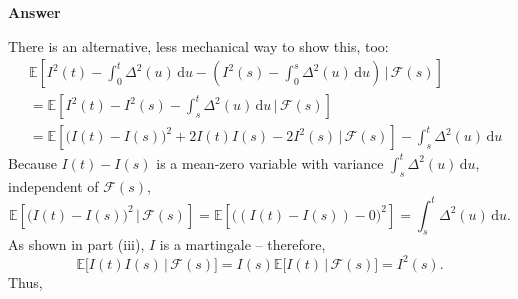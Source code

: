 \documentclass[11pt]{article}
\newcommand\E{\mathbb{E}}
\newcommand\cF{\mathcal{F}}
\newenvironment{hwanswer}
    {
        \vspace{2mm}
        {\bfseries Answer}
        \vspace{-\abovedisplayskip}
        \begin{center}
            \begin{tcolorbox}[
                width=0.95\textwidth,
                colback=white,
                colframe=white,
                opacityback=0,
                opacityframe=0,
                boxrule=0pt,
                frame hidden,
                breakable,
                before upper={\parindent15pt} %
            ]
            \lineskip=0pt %
    }
    {
        \end{tcolorbox}
        \end{center}
        \vspace{4mm}
    }
\begin{document}
\begin{hwanswer}
\begin{enumerate}[(i)]
            There is an alternative, less mechanical way to show this, too:
            \[
                \begin{aligned}
                    {}
                    &
                    \E\left[
                        I^2(t) - \int_{0}^{t} \Delta^2(u) \, \text{d} u
                        -
                        \left(
                            I^2(s) - \int_{0}^{s} \Delta^2(u) \, \text{d} u
                        \right)
                        \, \bigg| \,
                        \cF(s)
                    \right]
                    \\
                    &=
                    \E\left[
                        I^2(t) - I^2(s)
                        -
                        \int_{s}^{t} \Delta^2(u) \, \text{d} u
                        \, \bigg| \,
                        \cF(s)
                    \right]
                    \\
                    &=
                    \E\left[
                        \big( I(t) - I(s) \big)^2
                        +
                        2 I(t) I(s)
                        -
                        2 I^2(s)
                        \, | \,
                        \cF(s)
                    \right]
                    -
                    \int_{s}^{t} \Delta^2(u) \, \text{d} u
                \end{aligned}
            \]
            Because $I(t) - I(s)$ is a mean-zero variable with variance $\int_{s}^{t}
            \Delta^2(u) \, \text{d} u$, independent of $\cF(s)$,
            \[
                \E\left[
                    \big( I(t) - I(s) \big)^2
                    \, | \,
                    \cF(s)
                \right]
                =
                \E\left[
                    \big( (I(t) - I(s)) - 0 \big)^2
                \right]
                =
                \int_{s}^{t} \Delta^2(u) \, \text{d} u.
            \]
            As shown in part (iii), $I$ is a martingale -- therefore,
            \[
                \E\big[
                    I(t) I(s)
                    \, | \,
                    \cF(s)
                \big]
                =
                I(s)
                \E\big[
                    I(t)
                    \, | \, 
                    \cF(s)
                \big]
                =
                I^2(s).
            \]
            Thus,
            \[
                \begin{multlined}

\end{multlined}\]
\end{enumerate}
\end{hwanswer}
\end{document}

